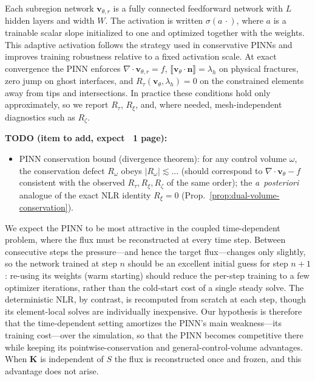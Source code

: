 \documentclass[a4paper,fleqn]{cas-sc}
\newcommand{\jump}[1]{\lBrack #1 \rBrack}
\newcommand{\Kmat}{\mathbf{K}}
\newcommand{\vflux}{\mathbf{v}}
\begin{document}
Each subregion network \(\vflux_{\theta,r}\) is a fully connected feedforward network
with \(L\) hidden layers and width \(W\). The activation is written
\(\sigma(a\,\cdot)\), where \(a\) is a trainable scalar slope initialized to one
and optimized together with the weights. This adaptive activation follows the
strategy used in conservative PINNs \citep{Jagtap2020} and improves training
robustness relative to a fixed activation scale. At exact convergence the PINN
enforces \(\nabla\cdot\vflux_{\theta,r}=f\),
\(\jump{\vflux_\theta\cdot\mathbf{n}}=\lambda_h\) on physical fractures, zero
jump on ghost interfaces, and \(R_\tau(\vflux_\theta,\lambda_h)=0\) on the
constrained elements away from tips and intersections. In practice these
conditions hold only approximately, so we report \(R_\tau\), \(R_\xi\), and,
where needed, mesh-independent diagnostics such as \(R_\zeta\).

{\color{red}
\noindent\textbf{TODO (item to add, expect ~1 page):}
\begin{itemize}
\item PINN conservation bound (divergence theorem): for any control volume \(\omega\), the conservation defect \(R_\omega\) obeys \(|R_\omega|\lesssim ...\) (should correspond to $\nabla \cdot \vflux_{\theta} - f$ consistent with the observed \(R_\tau,R_\xi,R_\zeta\) of the same order); the \emph{a~posteriori} analogue of the exact NLR identity \(R_\xi=0\) (Prop.~\ref{prop:dual-volume-conservation}).
\end{itemize}
}

We expect the PINN to be most attractive in the coupled time-dependent problem,
where the flux must be reconstructed at every time step. Between consecutive steps
the pressure---and hence the target flux---changes only slightly, so the network
trained at step \(n\) should be an excellent initial guess for step \(n+1\):
re-using its weights (warm starting) should reduce the per-step training to a few
optimizer iterations, rather than the cold-start cost of a single steady solve.
The deterministic NLR, by contrast, is recomputed from scratch at each step,
though its element-local solves are individually inexpensive. Our hypothesis is
therefore that the time-dependent setting amortizes the PINN's main
weakness---its training cost---over the simulation, so that the PINN becomes
competitive there while keeping its pointwise-conservation and
general-control-volume advantages. When \(\Kmat\) is independent of \(S\) the flux
is reconstructed once and frozen, and this advantage does not arise.
\end{document}
